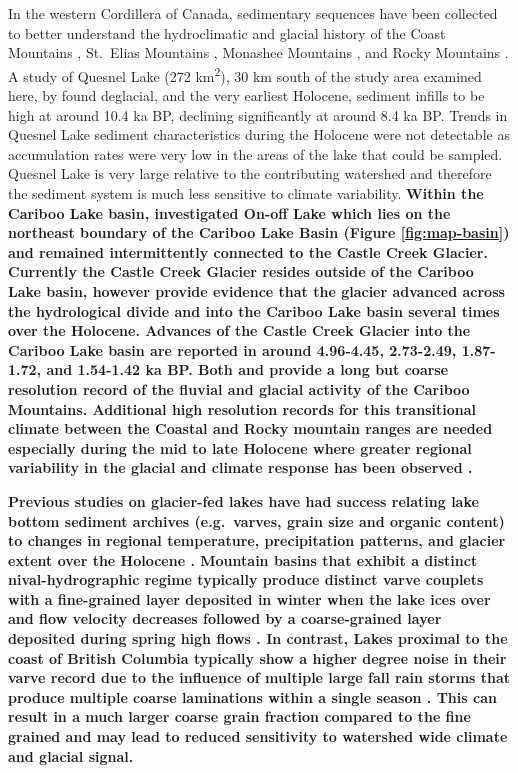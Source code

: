 \documentclass[Royal,times,doublespace,sageh]{sagej}
\begin{document}
In the western Cordillera of Canada, sedimentary sequences have been
collected to better understand the hydroclimatic and glacial history of
the Coast Mountains \citep{Menounos2008c}, St.~Elias Mountains
\citep{Crookshanks2008}, Monashee Mountains \citep{Hodder2006b}, and
Rocky Mountains \citep{Leonard1986, Dirszowsky1997a, Desloges1999}. A
study of Quesnel Lake (272 km\textsuperscript{2}), 30 km south of the
study area examined here, by \citet{Gilbert2012} found deglacial, and
the very earliest Holocene, sediment infills to be high at around 10.4
ka BP, declining significantly at around 8.4 ka BP. Trends in Quesnel
Lake sediment characteristics during the Holocene were not detectable as
accumulation rates were very low in the areas of the lake that could be
sampled. Quesnel Lake is very large relative to the contributing
watershed and therefore the sediment system is much less sensitive to
climate variability. \textbf{Within the Cariboo Lake basin,
\citet{Maurer2012b} investigated On-off Lake which lies on the northeast
boundary of the Cariboo Lake Basin (Figure \ref{fig:map-basin}) and
remained intermittently connected to the Castle Creek Glacier. Currently
the Castle Creek Glacier resides outside of the Cariboo Lake basin,
however \citet{Maurer2012b} provide evidence that the glacier advanced
across the hydrological divide and into the Cariboo Lake basin several
times over the Holocene. Advances of the Castle Creek Glacier into the
Cariboo Lake basin are reported in \citet{Maurer2012b} around 4.96-4.45,
2.73-2.49, 1.87-1.72, and 1.54-1.42 ka BP. Both \citet{Gilbert2012} and
\citet{Maurer2012b} provide a long but coarse resolution record of the
fluvial and glacial activity of the Cariboo Mountains. Additional high
resolution records for this transitional climate between the Coastal and
Rocky mountain ranges are needed especially during the mid to late
Holocene where greater regional variability in the glacial and climate
response has been observed \citep{Steinman2019, Menounos2009b}.}

\textbf{Previous studies on glacier-fed lakes have had success relating
lake bottom sediment archives (e.g.~varves, grain size and organic
content) to changes in regional temperature, precipitation patterns, and
glacier extent over the Holocene
\citep{Desloges1999, Hodder2006b, Leonard1997, Menounos2006b, Menounos2008c}.
Mountain basins that exhibit a distinct nival-hydrographic regime
typically produce distinct varve couplets with a fine-grained layer
deposited in winter when the lake ices over and flow velocity decreases
followed by a coarse-grained layer deposited during spring high flows
\citep[e.g.][]{Leonard1997, Hodder2007c, Desloges1999}. In contrast,
Lakes proximal to the coast of British Columbia typically show a higher
degree noise in their varve record due to the influence of multiple
large fall rain storms that produce multiple coarse laminations within a
single season \citep[e.g.][]{Gilbert1997, Menounos2008c}. This can
result in a much larger coarse grain fraction compared to the fine
grained and may lead to reduced sensitivity to watershed wide climate
and glacial signal.}
\end{document}
